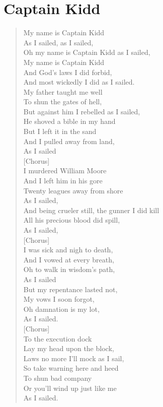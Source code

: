 \documentclass[11pt]{article}
\begin{document}
\section{Captain Kidd}
\label{sec:orga70de48}
\begin{verse}
My name is Captain Kidd\\
As I sailed, as I sailed,\\
Oh my name is Captain Kidd as I sailed,\\
My name is Captain Kidd\\
And God's laws I did forbid,\\
And most wickedly I did as I sailed.\\
\vspace*{1em}
My father taught me well\\
To shun the gates of hell,\\
But against him I rebelled as I sailed,\\
He shoved a bible in my hand\\
But I left it in the sand\\
And I pulled away from land,\\
As I sailed\\
\vspace*{1em}
[Chorus]\\
\vspace*{1em}
I murdered William Moore\\
And I left him in his gore\\
Twenty leagues away from shore\\
As I sailed,\\
And being crueler still, the gunner I did kill\\
All his precious blood did spill,\\
As I sailed,\\
\vspace*{1em}
[Chorus]\\
\vspace*{1em}
I was sick and nigh to death,\\
And I vowed at every breath,\\
Oh to walk in wisdom's path,\\
As I sailed\\
But my repentance lasted not,\\
My vows I soon forgot,\\
Oh damnation is my lot,\\
As I sailed.\\
\vspace*{1em}
[Chorus]\\
\vspace*{1em}
To the execution dock\\
Lay my head upon the block,\\
Laws no more I'll mock as I sail,\\
So take warning here and heed\\
To shun bad company\\
Or you'll wind up just like me\\
As I sailed.\\
\end{verse}
\clearpage
\end{document}

